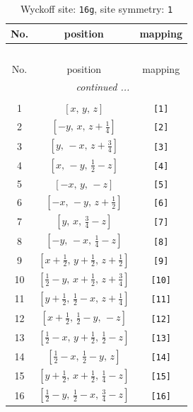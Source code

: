 \documentclass[fleqn,8pt]{jsarticle}
\begin{document}
\begin{longtable}{ccc}
\caption{Wyckoff site: {\tt 16g}, site symmetry: {\tt 1}}
 \\
 \hline \hline
No. & position & mapping \\ \hline \endfirsthead

\multicolumn{2}{l}{\tablename\ \thetable{}} \\
 \hline \hline
No. & position & mapping \\ \hline \endhead

 \hline \hline
\multicolumn{2}{r}{\footnotesize\it continued ...} \\ \endfoot

 \hline \hline
\multicolumn{2}{r}{} \\ \endlastfoot

1 & $\left[ x,\, y,\, z \right]$ & {\tt [1]} \\ \hline
2 & $\left[ - y,\, x,\, z + \frac{1}{4} \right]$ & {\tt [2]} \\ \hline
3 & $\left[ y,\, - x,\, z + \frac{3}{4} \right]$ & {\tt [3]} \\ \hline
4 & $\left[ x,\, - y,\, \frac{1}{2} - z \right]$ & {\tt [4]} \\ \hline
5 & $\left[ - x,\, y,\, - z \right]$ & {\tt [5]} \\ \hline
6 & $\left[ - x,\, - y,\, z + \frac{1}{2} \right]$ & {\tt [6]} \\ \hline
7 & $\left[ y,\, x,\, \frac{3}{4} - z \right]$ & {\tt [7]} \\ \hline
8 & $\left[ - y,\, - x,\, \frac{1}{4} - z \right]$ & {\tt [8]} \\ \hline
9 & $\left[ x + \frac{1}{2},\, y + \frac{1}{2},\, z + \frac{1}{2} \right]$ & {\tt [9]} \\ \hline
10 & $\left[ \frac{1}{2} - y,\, x + \frac{1}{2},\, z + \frac{3}{4} \right]$ & {\tt [10]} \\ \hline
11 & $\left[ y + \frac{1}{2},\, \frac{1}{2} - x,\, z + \frac{1}{4} \right]$ & {\tt [11]} \\ \hline
12 & $\left[ x + \frac{1}{2},\, \frac{1}{2} - y,\, - z \right]$ & {\tt [12]} \\ \hline
13 & $\left[ \frac{1}{2} - x,\, y + \frac{1}{2},\, \frac{1}{2} - z \right]$ & {\tt [13]} \\ \hline
14 & $\left[ \frac{1}{2} - x,\, \frac{1}{2} - y,\, z \right]$ & {\tt [14]} \\ \hline
15 & $\left[ y + \frac{1}{2},\, x + \frac{1}{2},\, \frac{1}{4} - z \right]$ & {\tt [15]} \\ \hline
16 & $\left[ \frac{1}{2} - y,\, \frac{1}{2} - x,\, \frac{3}{4} - z \right]$ & {\tt [16]} \\
\end{longtable}
\end{document}
